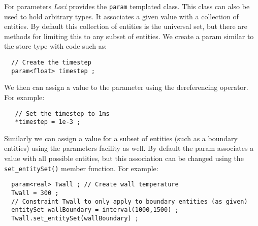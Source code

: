 \documentclass[10pt,epsf]{book}
\begin{document}
For parameters {\it Loci} provides the {\tt param} templated class.  This
class can also be used to hold arbitrary types.  It associates a given
value with a collection of entities.  By default this collection of
entities is the universal set, but there are methods for limiting this
to any subset of entities.  We create a param similar to the store
type with code such as:
\begin{verbatim}
  // Create the timestep
  param<float> timestep ;
\end{verbatim}
We then can assign a value to the parameter using the dereferencing
{\tt *} operator.  For example:
\begin{verbatim}
   // Set the timestep to 1ms
   *timestep = 1e-3 ;
\end{verbatim}
Similarly we can assign a value for a subset of entities (such as a
boundary entities) using the parameters facility as well.  By default
the param associates a value with all possible entities, but this
association can be changed using the {\tt set\_entitySet()} member
function.  For example:
\begin{verbatim}
  param<real> Twall ; // Create wall temperature
  Twall = 300 ;
  // Constraint Twall to only apply to boundary entities (as given)
  entitySet wallBoundary = interval(1000,1500) ; 
  Twall.set_entitySet(wallBoundary) ;
\end{verbatim}



\end{document}
